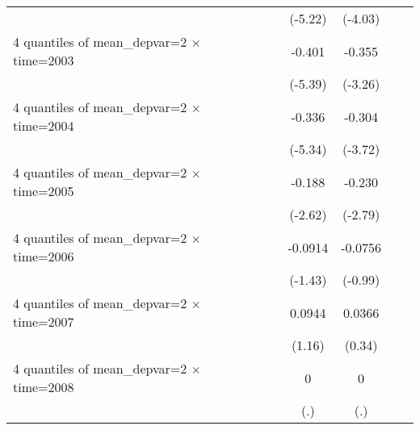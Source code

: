 \begin{table}[htbp]
\begin{tabular}{l*{6}{c}}
                    &                     &                     &     (-5.22)         &     (-4.03)         &                     &                     \\
[1em]
4 quantiles of mean\_depvar=2 $\times$ time=2003&                     &                     &      -0.401\sym{***}&      -0.355\sym{***}&                     &                     \\
                    &                     &                     &     (-5.39)         &     (-3.26)         &                     &                     \\
[1em]
4 quantiles of mean\_depvar=2 $\times$ time=2004&                     &                     &      -0.336\sym{***}&      -0.304\sym{***}&                     &                     \\
                    &                     &                     &     (-5.34)         &     (-3.72)         &                     &                     \\
[1em]
4 quantiles of mean\_depvar=2 $\times$ time=2005&                     &                     &      -0.188\sym{**} &      -0.230\sym{**} &                     &                     \\
                    &                     &                     &     (-2.62)         &     (-2.79)         &                     &                     \\
[1em]
4 quantiles of mean\_depvar=2 $\times$ time=2006&                     &                     &     -0.0914         &     -0.0756         &                     &                     \\
                    &                     &                     &     (-1.43)         &     (-0.99)         &                     &                     \\
[1em]
4 quantiles of mean\_depvar=2 $\times$ time=2007&                     &                     &      0.0944         &      0.0366         &                     &                     \\
                    &                     &                     &      (1.16)         &      (0.34)         &                     &                     \\
[1em]
4 quantiles of mean\_depvar=2 $\times$ time=2008&                     &                     &           0         &           0         &                     &                     \\
                    &                     &                     &         (.)         &         (.)         &                     &                     \\

\end{tabular}
\end{table}
